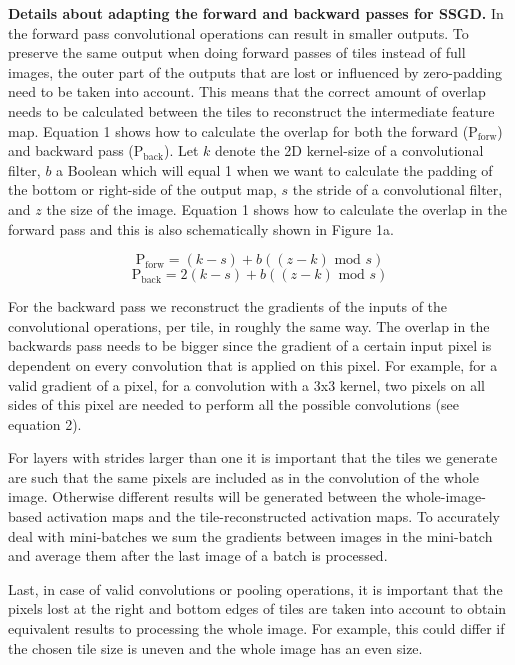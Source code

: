 \documentclass{article}
\begin{document}
\textbf{Details about adapting the forward and backward passes for SSGD.} In the forward pass convolutional operations can result in smaller outputs. To preserve the same output when doing forward passes of tiles instead of full images, the outer part of the outputs that are lost or influenced by zero-padding need to be taken into account. This means that the correct amount of overlap needs to be calculated between the tiles to reconstruct the intermediate feature map. Equation 1 shows how to calculate the overlap for both the forward ($\text{P}_\text{forw}$) and backward pass ($\text{P}_\text{back}$). Let \(k\) denote the 2D kernel-size of a convolutional filter, \(b\) a Boolean which will equal 1 when we want to calculate the padding of the bottom or right-side of the output map, \(s\) the stride of a convolutional filter, and \(z\) the size of the image. Equation 1 shows how to calculate the overlap in the forward pass and this is also schematically shown in Figure 1a.

\footnotesize
\scriptsize
  \begin{equation}
  \text{P}_\text{forw} = (k - s) + b((z - k) \text{ mod } s)
  \end{equation}
  \begin{equation}
  \text{P}_\text{back} = 2(k - s) + b((z - k) \text{ mod } s)
  \end{equation}
\normalsize

For the backward pass we reconstruct the gradients of the inputs of the convolutional operations, per tile, in roughly the same way. The overlap in the backwards pass needs to be bigger since the gradient of a certain input pixel is dependent on every convolution that is applied on this pixel. For example, for a valid gradient of a pixel, for a convolution with a 3x3 kernel, two pixels on all sides of this pixel are needed to perform all the possible convolutions (see equation 2).

For layers with strides larger than one it is important that the tiles we generate are such that the same pixels are included as in the convolution of the whole image. Otherwise different results will be generated between the whole-image-based activation maps and the tile-reconstructed activation maps. To accurately deal with mini-batches we sum the gradients between images in the mini-batch and average them after the last image of a batch is processed. 

Last, in case of valid convolutions or pooling operations, it is important that the pixels lost at the right and bottom edges of tiles are taken into account to obtain equivalent results to processing the whole image. For example, this could differ if the chosen tile size is uneven and the whole image has an even size.
\end{document}
